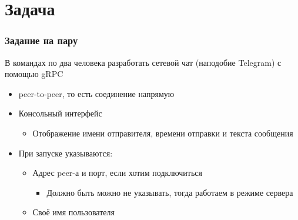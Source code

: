 \documentclass{../../slides-style}
\author[Юрий Литвинов]{Юрий Литвинов \newline \textcolor{gray}{\small\texttt{yurii.litvinov@gmail.com}}}
\begin{document}
	
	\begin{frame}[plain]
        \titlepage
    \end{frame}

	\section{Задача}

	\begin{frame}
		\frametitle{Задание на пару}
		В командах по два человека разработать сетевой чат (наподобие Telegram) с помощью gRPC
		\begin{itemize}
			\item peer-to-peer, то есть соединение напрямую
			\item Консольный интерфейс
			\begin{itemize}
				\item Отображение имени отправителя, времени отправки и текста сообщения
			\end{itemize}
			\item При запуске указываются:
			\begin{itemize}
				\item Адрес peer-а и порт, если хотим подключиться
				\begin{itemize}
					\item Должно быть можно не указывать, тогда работаем в режиме сервера
				\end{itemize}
				\item Своё имя пользователя
			\end{itemize}
		\end{itemize}
	\end{frame}
\end{document}
